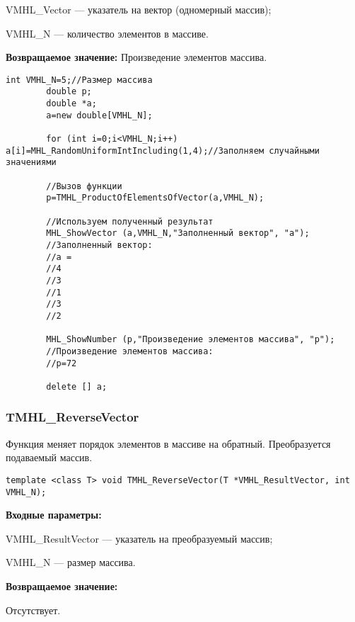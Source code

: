 \documentclass[a4paper,12pt]{article}
\begin{document}
 VMHL\_Vector --- указатель на вектор (одномерный массив);
 
 VMHL\_N --- количество элементов в массиве.

\textbf{Возвращаемое значение:}
 Произведение элементов массива.


\begin{lstlisting}[label=code_use_TMHL_ProductOfElementsOfVector,caption=Пример использования]
        int VMHL_N=5;//Размер массива
        double p;
        double *a;
        a=new double[VMHL_N];

        for (int i=0;i<VMHL_N;i++) a[i]=MHL_RandomUniformIntIncluding(1,4);//Заполняем случайными значениями

        //Вызов функции
        p=TMHL_ProductOfElementsOfVector(a,VMHL_N);

        //Используем полученный результат
        MHL_ShowVector (a,VMHL_N,"Заполненный вектор", "a");
        //Заполненный вектор:
        //a =
        //4
        //3
        //1
        //3
        //2

        MHL_ShowNumber (p,"Произведение элементов массива", "p");
        //Произведение элементов массива:
        //p=72

        delete [] a;
\end{lstlisting}

\subsubsection{TMHL\_ReverseVector}\label{TMHL_ReverseVector}

Функция меняет порядок элементов в массиве на обратный. Преобразуется подаваемый массив.


\begin{lstlisting}[label=code_syntax_TMHL_ReverseVector,caption=Синтаксис]
template <class T> void TMHL_ReverseVector(T *VMHL_ResultVector, int VMHL_N);
\end{lstlisting}

\textbf{Входные параметры:}  
 
VMHL\_ResultVector --- указатель на преобразуемый массив;
 
VMHL\_N --- размер массива.

\textbf{Возвращаемое значение:}

Отсутствует.
\end{document}
